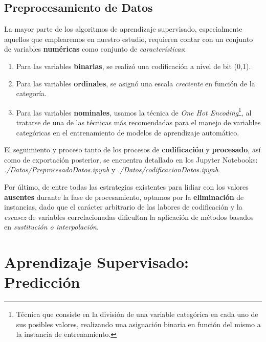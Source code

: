 

 \subsection{Preprocesamiento de Datos}

 La mayor parte de los algoritmos de aprendizaje supervisado, especialmente aquellos que emplearemos en nuestro estudio, requieren contar con un conjunto de variables \textbf{numéricas} como conjunto de \textit{características}:
 
 \begin{enumerate}
     \item Para las variables \textbf{binarias}, se realizó una codificación a nivel de bit (0,1).
     \item Para las variables \textbf{ordinales}, se asignó una escala \textit{creciente} en función de la categoría.
     \item Para las variables \textbf{nominales}, usamos la técnica de \textit{One Hot Encoding}\footnote{Técnica que consiste en la división de una variable categórica en cada uno de sus posibles valores, realizando una asignación binaria en función del mismo a la instancia de entrenamiento.}, al tratarse de una de las técnicas más recomendadas para el manejo de variables categóricas en el entrenamiento de modelos de aprendizaje automático\cite{Potdar2017AClassifiers}.
 \end{enumerate}

 El seguimiento y proceso tanto de los procesos de \textbf{codificación} y \textbf{procesado}, así como de exportación posterior, se encuentra detallado en los Jupyter Notebooks: \textit{./Datos/PreprocesadoDatos.ipynb} y \textit{./Datos/codificacionDatos.ipynb}.

Por último, de entre todas las estrategias\cite{Emmanuel2021ALearning} existentes para lidiar con los valores \textbf{ausentes} durante la fase de procesamiento, optamos por la \textbf{eliminación} de instancias, dado que el carácter arbitrario de las labores de codificación y la \textit{escasez} de variables correlacionadas dificultan la aplicación de métodos basados en \textit{sustitución o interpolación}. 

\newpage

\section{Aprendizaje Supervisado: Predicción}

